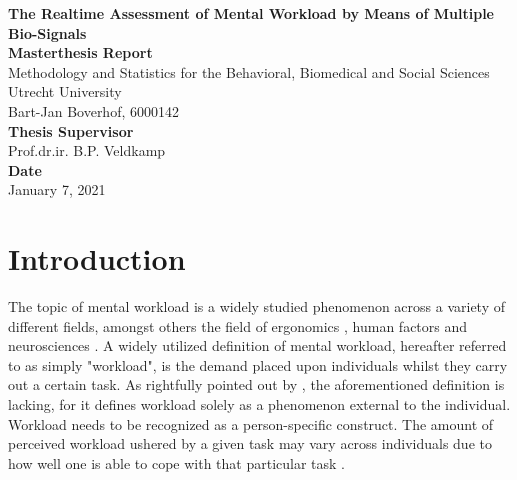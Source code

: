 \documentclass[12pt]{article}
\begin{document}
\begin{titlepage}
\begin{center}
\LARGE{\textbf{The Realtime Assessment of Mental Workload by Means of Multiple Bio-Signals}}\\
\vspace*{2\baselineskip}
\Large{\textbf{Masterthesis Report}}\\
Methodology and Statistics for the Behavioral, Biomedical and Social Sciences\\
\vspace*{1\baselineskip}
Utrecht University\\
\vspace*{4\baselineskip}
{Bart-Jan Boverhof, 6000142}\\
\vspace*{1\baselineskip}
{\textbf{Thesis Supervisor}}\\
Prof.dr.ir. B.P. Veldkamp\\
\vspace*{1\baselineskip}
{\textbf{Date}}\\
January 7, 2021\\
\vspace*{1\baselineskip}
\end{center}
\end{titlepage}

\section{Introduction}
The topic of mental workload is a widely studied phenomenon across a variety of different fields, amongst others the field of ergonomics \cite{young2015state}, human factors \cite{pretorius2007development} and neurosciences \cite{shuggi2017mental}. A widely utilized definition of mental workload, hereafter referred to as simply "workload", is the demand placed upon individuals whilst they carry out a certain task. As rightfully pointed out by , the aforementioned definition is lacking, for it defines workload solely as a phenomenon external to the individual. Workload needs to be recognized as a person-specific construct. The amount of perceived workload ushered by a given task may vary across individuals due to how well one is able to cope with that particular task \cite{de1996measurement}. 
\end{document}
